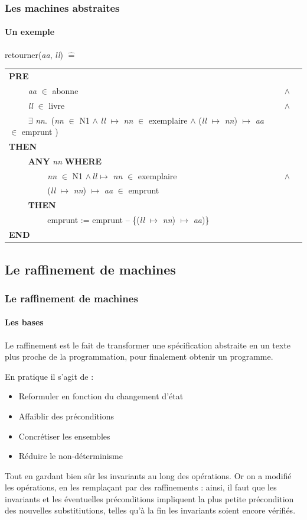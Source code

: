 \documentclass[11pt,a4paper,xcolor=table, handout]{beamer} %
\newcommand{\Bequal}{\mathrel{\widehat{=}}}
\begin{document}
\begin{frame}
\frametitle{Les machines abstraites}
\framesubtitle{Un exemple}
\indent retourner(\emph{aa}, \emph{ll}) $\Bequal$
\begin{longtable}{lll}
\textbf{PRE} \tabularnewline
~~~~ \emph{aa} $\in$ abonne & $\wedge$ \tabularnewline 
~~~~ \emph{ll} $\in$ livre & $\wedge$ \tabularnewline
~~~~ $\exists$ \emph{nn}.\ (\emph{nn} $\in$ N1 $\wedge$ \emph{ll} $\mapsto$ \emph{nn} $\in$ exemplaire $\wedge$ (\emph{ll} $\mapsto$ \emph{nn}) $\mapsto$ \emph{aa} $\in$ emprunt )\tabularnewline
\textbf{THEN} \tabularnewline
~~~~ \textbf{ANY} \emph{nn} \textbf{WHERE} \tabularnewline
~~~~ ~~~~ \emph{nn} $\in$ N1 $\wedge~ll \mapsto$ \emph{nn} $\in$ exemplaire & $\wedge$ \tabularnewline
~~~~ ~~~~ (\emph{ll} $\mapsto$ \emph{nn}) $\mapsto$ \emph{aa} $\in$ emprunt \tabularnewline
~~~~ \textbf{THEN} \tabularnewline
~~~~ ~~~~ emprunt := emprunt -- \{(\emph{ll} $\mapsto$ \emph{nn}) $\mapsto$ \emph{aa})\} \tabularnewline
\textbf{END} \tabularnewline
\end{longtable}
\end{frame}

\subsection{Le raffinement de machines}
\begin{frame}
\frametitle{Le raffinement de machines}
\framesubtitle{Les bases}
Le raffinement est le fait de transformer une spécification abstraite en un texte plus proche de la programmation, pour finalement obtenir un programme.

En pratique il s'agit de :
\begin{itemize}
\pause
\item Reformuler en fonction du changement d'état
\pause
\item Affaiblir des préconditions
\pause
\item Concrétiser les ensembles
\pause
\item Réduire le non-déterminisme
\end{itemize}
\pause
Tout en gardant bien sûr les invariants au long des opérations. Or on a modifié les opérations, en les remplaçant par des raffinements : ainsi, il faut que les invariants et les éventuelles préconditions impliquent la plus petite précondition des nouvelles substitiutions, telles qu'à la fin les invariants soient encore vérifiés.
\end{frame}
\end{document}
